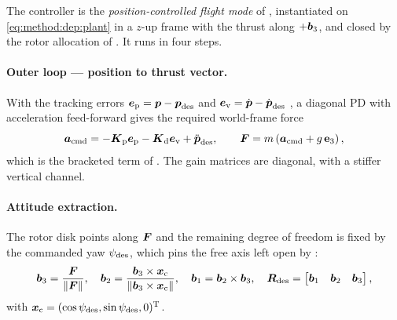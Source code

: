 The controller is the \emph{position-controlled flight mode} of
\parencite[Eqs.~(19)--(23)]{lee2010geometric}, instantiated on \eqref{eq:method:dep:plant} in a
$z$-up frame with the thrust along $+\boldsymbol{b}_{3}$, and closed by the rotor allocation of
\parencite{mellinger2011minimum}. It runs in four steps.

\paragraph{Outer loop --- position to thrust vector.} With the tracking errors
$\boldsymbol{e}_{\textrm{p}} = \boldsymbol{p}-\boldsymbol{p}_{\textrm{des}}$ and
$\boldsymbol{e}_{\textrm{v}} = \dot{\boldsymbol{p}}-\dot{\boldsymbol{p}}_{\textrm{des}}$
\parencite[Eqs.~(17)--(18)]{lee2010geometric}, a diagonal PD with acceleration feed-forward gives
the required world-frame force
\begin{equation}\label{eq:method:dep:outer}
  \boldsymbol{a}_{\textrm{cmd}} = -\boldsymbol{K}_{\textrm{p}}\boldsymbol{e}_{\textrm{p}} - \boldsymbol{K}_{\textrm{d}}\boldsymbol{e}_{\textrm{v}} + \ddot{\boldsymbol{p}}_{\textrm{des}},
  \qquad
  \boldsymbol{F} = m\left(\boldsymbol{a}_{\textrm{cmd}} + g\,\textbf{e}_{3}\right),
\end{equation}
which is the bracketed term of \parencite[Eq.~(23)]{lee2010geometric}. The gain matrices are
diagonal, with a stiffer vertical channel.

\paragraph{Attitude extraction.} The rotor disk points along $\boldsymbol{F}$ and the remaining degree of
freedom is fixed by the commanded yaw $\psi_{\textrm{des}}$, which pins the free axis left open by
\parencite[Eqs.~(22)--(23)]{lee2010geometric}:
\begin{equation}\label{eq:method:dep:att}
  \boldsymbol{b}_{3} = \frac{\boldsymbol{F}}{\|\boldsymbol{F}\|},\quad
  \boldsymbol{b}_{2} = \frac{\boldsymbol{b}_{3}\times\boldsymbol{x}_{\textrm{c}}}{\|\boldsymbol{b}_{3}\times\boldsymbol{x}_{\textrm{c}}\|},\quad
  \boldsymbol{b}_{1} = \boldsymbol{b}_{2}\times\boldsymbol{b}_{3},\quad
  \boldsymbol{R}_{\textrm{des}} = \begin{bmatrix}\boldsymbol{b}_{1} & \boldsymbol{b}_{2} & \boldsymbol{b}_{3}\end{bmatrix},
\end{equation}
with $\boldsymbol{x}_{\textrm{c}} = (\cos\psi_{\textrm{des}},\sin\psi_{\textrm{des}},0)^{\textrm{T}}$.

